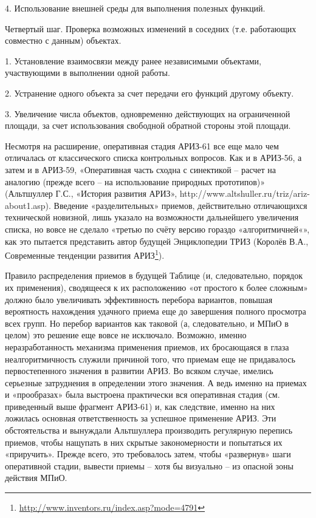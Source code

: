 \documentclass[11pt,a4paper]{article}
\begin{document}
4. Использование внешней среды для выполнения полезных функций.

Четвертый шаг. Проверка возможных изменений в соседних (т.е. работающих
совместно с данным) объектах.

1. Установление взаимосвязи между ранее независимыми объектами, участвующими в
выполнении одной работы.

2. Устранение одного объекта за счет передачи его функций другому объекту.

3. Увеличение числа объектов, одновременно действующих на ограниченной
площади, за счет использования свободной обратной стороны этой площади.

Несмотря на расширение, оперативная стадия АРИЗ-61 все еще мало чем отличалась
от классического списка контрольных вопросов. Как и в АРИЗ-56, а затем и в
АРИЗ-59, «Оперативная часть сходна с синектикой -- расчет на аналогию (прежде
всего -- на использование природных прототипов)» (Альтшуллер Г.С., «История
развития АРИЗ», http://www.altshuller.ru/triz/ariz-about1.asp). Введение
«разделительных» приемов, действительно отличающихся технической новизной,
лишь указало на возможности дальнейшего увеличения списка, но вовсе не сделало
«третью по счёту версию гораздо «алгоритмичней«», как это пытается представить
автор будущей Энциклопедии ТРИЗ (Королёв В.А., Современные тенденции развития
АРИЗ\footnote{\url{http://www.inventors.ru/index.asp?mode=4791}}).

Правило распределения приемов в будущей Таблице (и, следовательно, порядок их
применения), сводящееся к их расположению «от простого к более сложным» должно
было увеличивать эффективность перебора вариантов, повышая вероятность
нахождения удачного приема еще до завершения полного просмотра всех групп. Но
перебор вариантов как таковой (а, следовательно, и МПиО в целом) это решение
еще вовсе не исключало. Возможно, именно неразработанность механизма
применения приемов, их бросающаяся в глаза неалгоритмичность служили причиной
того, что приемам еще не придавалось первостепенного значения в развитии
АРИЗ. Во всяком случае, имелись серьезные затруднения в определении этого
значения. А ведь именно на приемах и «прообразах» была выстроена практически
вся оперативная стадия (см. приведенный выше фрагмент АРИЗ-61) и, как
следствие, именно на них ложилась основная ответственность за успешное
применение АРИЗ. Эти обстоятельства и вынуждали Альтшуллера производить
регулярную перепись приемов, чтобы нащупать в них скрытые закономерности и
попытаться их «приручить». Прежде всего, это требовалось затем, чтобы
«развернув» шаги оперативной стадии, вывести приемы -- хотя бы визуально -- из
опасной зоны действия МПиО.
\end{document}
